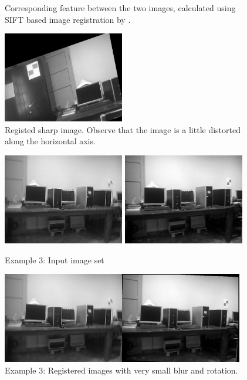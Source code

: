 \documentclass[BTech]{iitmdiss}
\begin{document}
\begin{figure}[H]
\begin{center}
\caption{Corresponding feature between the two images, calculated using SIFT based image registration by \citet{pyimreg}.}
\vspace{0.5cm}
\includegraphics[width=150pt]{images/imreg/rotation/eg1/sift_output.png}
\caption{Registed sharp image. Observe that the image is a little distorted
along the horizontal axis.}
\end{center}
\end{figure}


\begin{figure}[H]
\begin{center}
\includegraphics[width=150pt]{images/imreg/rotation/eg3/saved_im.png}
\includegraphics[width=150pt]{images/imreg/rotation/eg3/preview_im.png}
\caption{Example 3: Input image set}
\includegraphics[width=300pt]{images/imreg/rotation/eg3/imreg.png}
\caption{Example 3: Registered images with very small blur and rotation.}
\label{fig:rotate_reg}
\end{center}
\end{figure}
\end{document}
